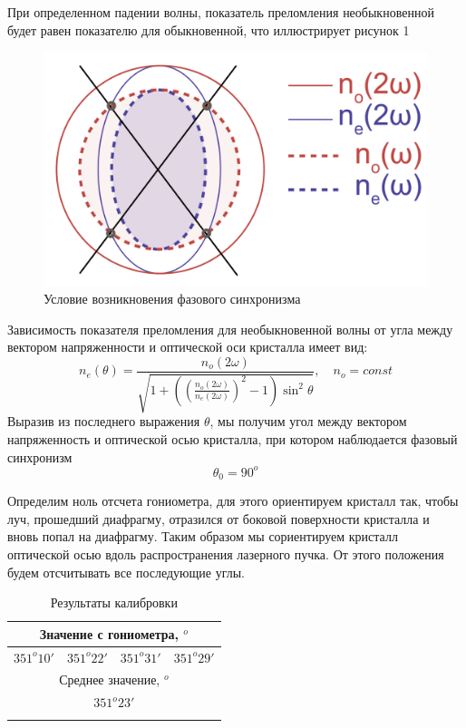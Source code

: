 \documentclass[a4paper, 12pt]{article}%
\begin{document}
	\par При определенном падении волны, показатель преломления необыкновенной будет равен показателю для обыкновенной, что иллюстрирует рисунок 1 
	\begin{figure}[h!]
		\centering
		\includegraphics[width=0.7\linewidth]{Sinhronismwiki.png}
		\caption{Условие возникновения фазового синхронизма}
	\end{figure}
	Зависимость показателя преломления для необыкновенной волны от угла между вектором напряженности и оптической оси кристалла имеет вид:
	\begin{equation}
		n_e(\theta)  = \frac{n_o(2\omega)}{\sqrt{1 + ((\frac{n_o(2\omega)}{n_e(2\omega)})^2 - 1)\sin^2{\theta}}}, \quad n_o = const
	\end{equation}
	Выразив из последнего выражения $\theta$, мы получим угол между вектором напряженность и оптической осью кристалла, при котором наблюдается фазовый синхронизм
	\begin{equation}
		\theta_{0} = 90^{o}
	\end{equation}
	
	
	Определим ноль отсчета гониометра, для этого ориентируем кристалл так, чтобы луч, прошедший диафрагму, отразился от боковой поверхности кристалла и вновь попал на диафрагму. Таким образом мы сориентируем кристалл оптической осью вдоль распространения лазерного пучка. От этого положения будем отсчитывать все последующие углы.\\
	
	\begin{longtable}{|c|c|c|c|}
		\hline
		\multicolumn{4}{|c|}{Значение с гониометра, $^{o}$}\\
		\hline
		$351^{o}10'$&$351^{o}22'$&$351^{o}31'$&$351^{o}29'$ \\
		\hline
		\multicolumn{4}{|c|}{Среднее значение, $^{o}$}\\
		\hline
		\multicolumn{4}{c}{$351^{o}23'$}\\
		\hline
		\caption{Результаты калибровки}
	\end{longtable}
\end{document}
